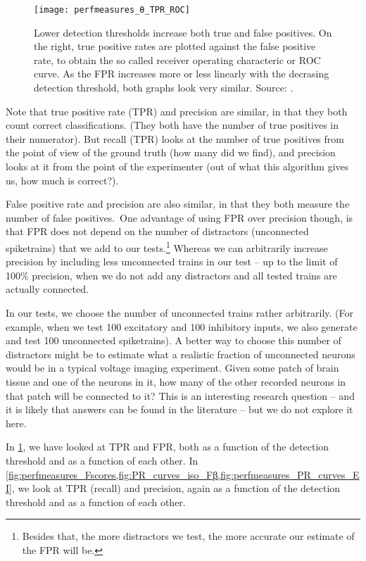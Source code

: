 \begin{figure}
    \texttt{[image: perfmeasures\_θ\_TPR\_ROC]}
    \caption
    {Lower detection thresholds increase both true and false positives. On the right, true positive rates are plotted against the false positive rate, to obtain the so called receiver operating characteric or ROC curve. As the FPR increases more or less linearly with the decrasing detection threshold, both graphs look very similar.
    Source: .}
    \label{fig:perfmeasures_θ_TPR_ROC}
\end{figure}

Note that true positive rate (TPR) and precision are similar, in that they both count correct classifications. (They both have the number of true positives in their numerator). But recall (TPR) looks at the number of true positives from the point of view of the ground truth (how many did we find), and precision looks at it from the point of the experimenter (out of what this algorithm gives us, how much is correct?).

False positive rate and precision are also similar, in that they both measure the number of false positives.\
One advantage of using FPR over precision though, is that FPR does not depend on the number of distractors (unconnected spiketrains) that we add to our tests.\footnote{Besides that, the more distractors we test, the more accurate our estimate of the FPR will be.}
Whereas we can arbitrarily increase precision by including less unconnected trains in our test -- up to the limit of 100\% precision, when we do not add any distractors and all tested trains are actually connected.

In our tests, we choose the number of unconnected trains rather arbitrarily. (For example, when we test 100 excitatory and 100 inhibitory inputs, we also generate and test 100 unconnected spiketrains). A better way to choose this number of distractors might be to estimate what a realistic fraction of unconnected neurons would be in a typical voltage imaging experiment. Given some patch of brain tissue and one of the neurons in it, how many of the other recorded neurons in that patch will be connected to it? This is an interesting research question -- and it is likely that answers can be found in the literature -- but we do not explore it here.

In \cref{fig:perfmeasures_θ_TPR_ROC}, we have looked at TPR and FPR, both as a function of the detection threshold and as a function of each other. In \cref{fig:perfmeasures_Fscores,fig:PR_curves_iso_Fβ,fig:perfmeasures_PR_curves_EI}, we look at TPR (recall) and precision, again as a function of the detection threshold and as a function of each other.

